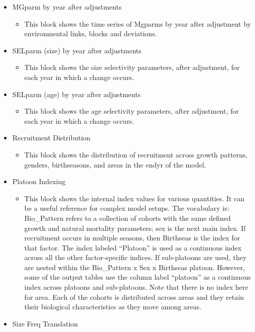 \begin{itemize}
	\item MGparm by year after adjustments
	\begin{itemize}
		\item This block shows the time series of Mgparms by year after adjustment by environmental links, blocks and deviations.
	\end{itemize}
	\item SELparm (size) by year after adjustments
	\begin{itemize}
		\item This block shows the size selectivity parameters, after adjustment, for each year in which a change occurs.
	\end{itemize}
	\item SELparm (age) by year after adjustments
	\begin{itemize}
		\item This block shows the age selectivity parameters, after adjustment, for each year in which a change occurs.
	\end{itemize}
	\item Recruitment Distribution
	\begin{itemize}
		\item This block shows the distribution of recruitment across growth patterns, genders, birthseasons, and areas in the endyr of the model.
	\end{itemize}
	\item Platoon Indexing
	\begin{itemize}
		\item This block shows the internal index values for various quantities.  It can be a useful reference for complex model setups.  The vocabulary is:  Bio\_Pattern refers to a collection of cohorts with the same defined growth and natural mortality parameters; sex is the next main index.  If recruitment occurs in multiple seasons, then Birthseas is the index for that factor.  The index labeled “Platoon” is used as a continuous index across all the other factor-specific indices.  If sub-platoons are used, they are nested within the Bio\_Pattern x Sex x Birthseas platoon.  However, some of the output tables use the column label “platoon” as a continuous index across platoons and sub-platoons.  Note that there is no index here for area.  Each of the cohorts is distributed across areas and they retain their biological characteristics as they move among areas.
	\end{itemize}
	\item Size Freq Translation

\end{itemize}
